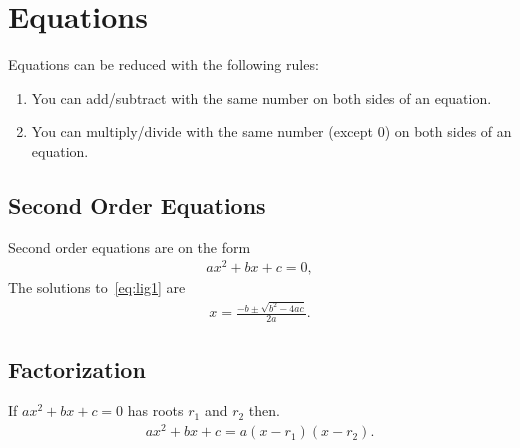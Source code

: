 \section{Equations}
Equations can be reduced with the following rules:
\begin{enumerate}
	\item You can add/subtract with the same number on both sides of an equation.
	\item You can multiply/divide with the same number (except 0) on both sides of an equation.
\end{enumerate}
\subsection{Second Order Equations}
Second order equations are on the form
\begin{align}\label{eq:lig1}
ax^2+bx+c=0,
\end{align}
The solutions to~\eqref{eq:lig1} are
\begin{align*}
x=\frac{-b\pm \sqrt{b^2-4ac}}{2a}.
\end{align*}
\subsection{Factorization}
If $ax^2+bx+c=0$ has roots $r_1$ and $r_2$ then.
\begin{align*}
ax^2+bx+c=a(x-r_1)(x-r_2).
\end{align*}
